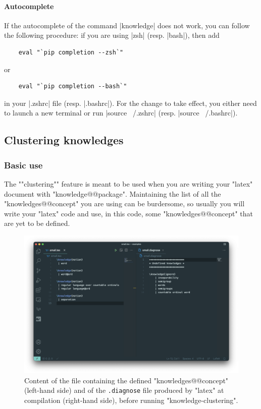 \documentclass{article}
\begin{document}
\paragraph{Autocomplete}
If the autocomplete of the command \spverb|knowledge| does not work,
you can follow the following procedure:
if you are using \spverb|zsh| (resp. \spverb|bash|), then add
%
\begin{verbatim}
    eval "`pip completion --zsh`"
\end{verbatim}
or 
\begin{verbatim}
    eval "`pip completion --bash`"
\end{verbatim}
%
in your \spverb|.zshrc| file (resp. \spverb|.bashrc|).
For the change to take effect, you either need to launch a new terminal
or run \spverb|source ~/.zshrc| (resp. \spverb|source ~/.bashrc|).

\subsection{Clustering knowledges}

\subsubsection{Basic use}

The \AP""clustering"" feature is meant to be used
when you are writing your "latex" document with "knowledge@@package".
Maintaining the list of all the "knowledges@@concept" you are using
can be burdersome, so usually you will write your "latex" code
and use, in this code, some "knowledges@@concept" that are yet to be
defined.

\begin{figure}[htb]
    \centering
    \includegraphics[width=.95\textwidth]{img/small-before.png}
    \caption{%
        \label{fig:clustering-before}
        Content of the file containing the defined "knowledges@@concept"
        (left-hand side) and of the \texttt{.diagnose} file produced by
        "latex" at compilation (right-hand side), before running 
        "knowledge-clustering".
    }
\end{figure}
\end{document}
